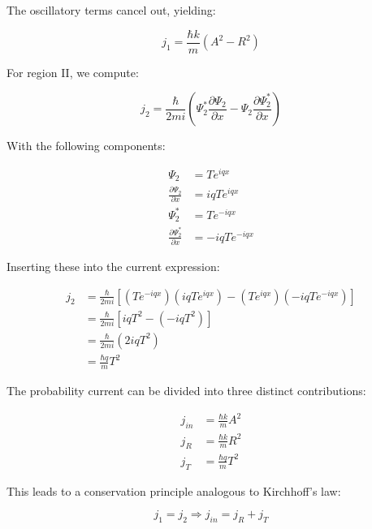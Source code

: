\documentclass[italian]{HKNdocument}
\begin{document}
The oscillatory terms cancel out, yielding:

\begin{equation*}
j_{1}=\frac{\hbar k}{m}\left(A^{2}-R^{2}\right) \tag{6.22}
\end{equation*}

For region II, we compute:

\begin{equation*}
j_{2}=\frac{\hbar}{2 m i}\left(\Psi_{2}^{*} \frac{\partial \Psi_{2}}{\partial x}-\Psi_{2} \frac{\partial \Psi_{2}^{*}}{\partial x}\right) \tag{6.23}
\end{equation*}

With the following components:

\begin{align*}
\Psi_{2} & =T e^{i q x} \\
\frac{\partial \Psi_{2}}{\partial x} & =i q T e^{i q x}  \tag{6.24}\\
\Psi_{2}^{*} & =T e^{-i q x} \\
\frac{\partial \Psi_{2}^{*}}{\partial x} & =-i q T e^{-i q x}
\end{align*}

Inserting these into the current expression:

\begin{align*}
j_{2} & =\frac{\hbar}{2 m i}\left[\left(T e^{-i q x}\right)\left(i q T e^{i q x}\right)-\left(T e^{i q x}\right)\left(-i q T e^{-i q x}\right)\right] \\
& =\frac{\hbar}{2 m i}\left[i q T^{2}-\left(-i q T^{2}\right)\right]  \tag{6.25}\\
& =\frac{\hbar}{2 m i}\left(2 i q T^{2}\right) \\
& =\frac{\hbar q}{m} T^{2}
\end{align*}

The probability current can be divided into three distinct contributions:

\begin{align*}
j_{i n} & =\frac{\hbar k}{m} A^{2} \\
j_{R} & =\frac{\hbar k}{m} R^{2}  \tag{6.26}\\
j_{T} & =\frac{\hbar q}{m} T^{2}
\end{align*}

This leads to a conservation principle analogous to Kirchhoff's law:

\begin{equation*}
j_{1}=j_{2} \Longrightarrow j_{i n}=j_{R}+j_{T} \tag{6.27}
\end{equation*}
\end{document}
